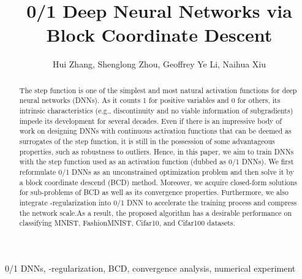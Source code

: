 \documentclass[journal]{IEEEtran}
\begin{document}
\title{\huge 0/1 Deep Neural Networks via Block Coordinate Descent
}





\author{Hui Zhang, Shenglong Zhou, Geoffrey Ye Li, Naihua Xiu}























\maketitle

\begin{abstract}
The step function is one of the simplest and most natural activation functions for deep neural networks (DNNs). As it counts 1 for positive variables and 0 for others, its intrinsic characteristics (e.g., discontinuity and no viable information of subgradients) impede its development for several decades. Even if there is an impressive body of work on designing DNNs with continuous activation functions that can be deemed as surrogates of  the step function, it is still in the possession of some advantageous properties, such as robustness to outliers. Hence,  in this paper, we aim to train DNNs with the step function used as an activation function (dubbed as 0/1 DNNs). We first reformulate 0/1 DNNs as an unconstrained optimization problem and then solve it by a  block coordinate descend (BCD) method. Moreover, we acquire closed-form solutions for sub-problems of BCD as well as its convergence properties. Furthermore, we also integrate -regularization into 0/1 DNN to accelerate the training process and compress the network scale.As a result, the proposed algorithm has a desirable performance on classifying MNIST, FashionMNIST, Cifar10, and Cifar100 datasets.
\end{abstract}
\begin{IEEEkeywords}
0/1 DNNs,  -regularization,  BCD,  convergence analysis,  numerical experiment
\end{IEEEkeywords}
\end{document}
